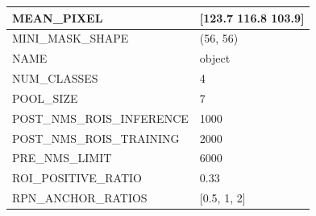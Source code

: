 \begin{longtable}[h]{|l|l|}
	MEAN\_PIXEL                     & {[}123.7 116.8 103.9{]}                                                                                                                                                                \\ \hline
	MINI\_MASK\_SHAPE               & (56, 56)                                                                                                                                                                               \\ \hline
	NAME                            & object                                                                                                                                                                                 \\ \hline
	NUM\_CLASSES                    & 4                                                                                                                                                                                      \\ \hline
	POOL\_SIZE                      & 7                                                                                                                                                                                      \\ \hline
	POST\_NMS\_ROIS\_INFERENCE      & 1000                                                                                                                                                                                   \\ \hline
	POST\_NMS\_ROIS\_TRAINING       & 2000                                                                                                                                                                                   \\ \hline
	PRE\_NMS\_LIMIT                 & 6000                                                                                                                                                                                   \\ \hline
	ROI\_POSITIVE\_RATIO            & 0.33                                                                                                                                                                                   \\ \hline
	RPN\_ANCHOR\_RATIOS             & {[}0.5, 1, 2{]}                                                                                                                                                                        \\ \hline

\end{longtable}
